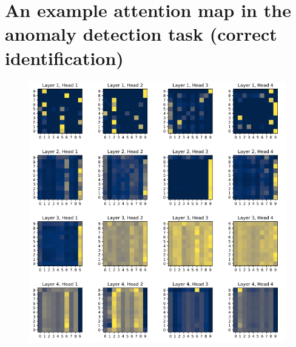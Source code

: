 \documentclass[peerreview]{IEEEtran}
\begin{document}
\section{An example attention map in the anomaly detection task (correct identification)} \label{App:anomaly_attention_map_correct}
\begin{figure}[!h]
\centering
\includegraphics[width=1\columnwidth]{anomaly_attention_map_correct.png} 
\end{figure}
\newpage
\end{document}
